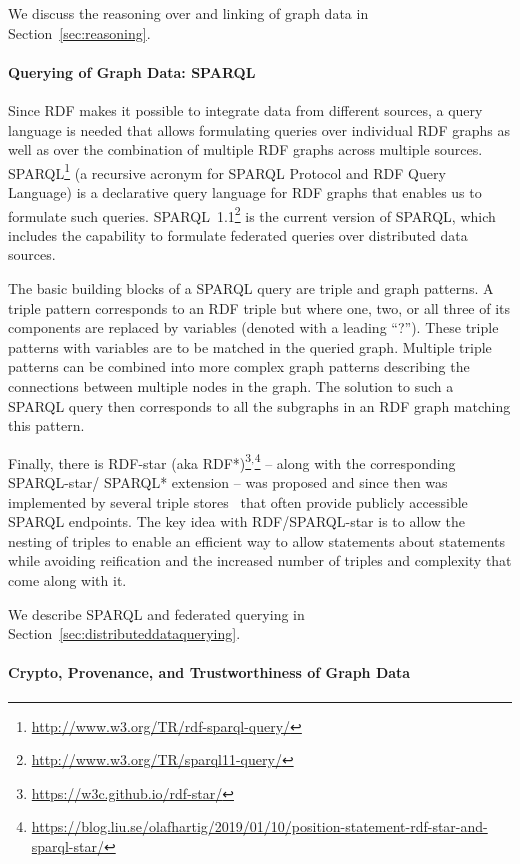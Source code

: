 \documentclass[a4paper,USenglish]{tgdk-v2021}
\newcommand{\myurl}[1]{\footnote{\url{#1}}}
\begin{document}
We discuss the reasoning over and linking of graph data in Section~\ref{sec:reasoning}.

\paragraph*{Querying of Graph Data: SPARQL}
Since RDF makes it possible to integrate data from different sources, a query language is needed that allows formulating queries over individual RDF graphs as well as over the combination of multiple RDF graphs across multiple sources. 
SPARQL\myurl{http://www.w3.org/TR/rdf-sparql-query/} (a recursive acronym for SPARQL Protocol and RDF Query Language) is a declarative query language for RDF graphs that enables us to formulate such queries. 
SPARQL~1.1\myurl{http://www.w3.org/TR/sparql11-query/} is the current version of SPARQL, which includes the capability to formulate federated queries over distributed data sources. 

The basic building blocks of a SPARQL query are triple and graph patterns. 
A triple pattern corresponds to an RDF triple but where one, two, or all three of its components are replaced by variables (denoted with a leading ``?''). 
These triple patterns with variables are to be matched in the queried graph.
Multiple triple patterns can be combined into more complex graph patterns describing the connections between multiple nodes in the graph. 
The solution to such a SPARQL query then corresponds to all the subgraphs in an RDF graph matching this pattern.

Finally, there is RDF-star (aka RDF*)\footnote{\url{https://w3c.github.io/rdf-star/}}$^,$\footnote{\url{https://blog.liu.se/olafhartig/2019/01/10/position-statement-rdf-star-and-sparql-star/}} -- along with the corresponding SPARQL-star/ SPARQL* extension -- was proposed and since then was implemented by several triple stores~\cite{AbuAebAgl23} that often provide publicly accessible SPARQL endpoints.
The key idea with RDF/SPARQL-star is to allow the nesting of triples to enable an efficient way to allow statements about statements while avoiding reification and the increased number of triples and complexity that come along with it.

We describe SPARQL and federated querying in Section~\ref{sec:distributeddataquerying}.

\paragraph*{Crypto, Provenance, and Trustworthiness of Graph Data}
\end{document}
